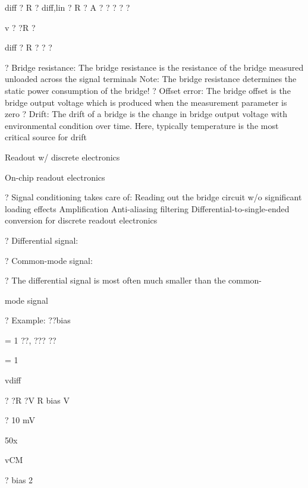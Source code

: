 \documentclass[2pt,landscape]{article}
\begin{document}
\begin{multicols*}{5}
diff ? R ?	diff,lin ? R ?
A ?	?	?	?	?

v	? ?R ?

diff ? R ?
?	?



?	Bridge resistance:
The bridge resistance is the resistance of the bridge measured 
unloaded across the signal terminals
Note: The bridge resistance determines the static power consumption 
of the bridge!
?	Offset error:
The bridge offset is the bridge output voltage which is produced when 
the measurement parameter is zero
?	Drift:
The drift of a bridge is the change in bridge output voltage with 
environmental condition over time. Here, typically temperature is the 
most critical source for drift





Readout w/ discrete 
electronics





On-chip readout 
electronics




?	Signal conditioning takes care of:
\textbullet 	Reading out the bridge circuit w/o significant loading effects
\textbullet 	Amplification
\textbullet 	Anti-aliasing filtering
\textbullet 	Differential-to-single-ended conversion for discrete readout electronics





?	Differential signal:


?	Common-mode signal:








?	The differential signal is most often much smaller than the common-


mode signal

?	Example: ??bias



= 1 ??, ???
??




= 1 %



vdiff


? ?R ?V
R	bias
V



? 10 mV




50x


vCM


?   bias
2



\end{multicols*}
\end{document}

